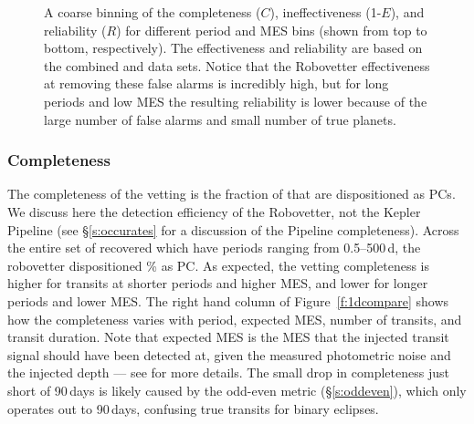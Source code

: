 \begin{figure}[hp]
\begin{center}
\begin{tabular}{c}
\end{tabular}
\caption{A coarse binning of the completeness ($C$), ineffectiveness (1-$E$), and reliability ($R$) for different period and MES bins (shown from top to bottom, respectively). The effectiveness and reliability are based on the combined \invtce{} and \scrtce{} data sets. Notice that the Robovetter effectiveness at removing these false alarms is incredibly high, but for long periods and low MES the resulting reliability is lower because of the large number of false alarms and small number of true planets.}
\label{f:scoregrid}
\end{center}
\end{figure}



\subsubsection{Completeness}
The completeness of the vetting is the fraction of  that are dispositioned as PCs. We discuss here the detection efficiency of the Robovetter, not the Kepler Pipeline (see \S\ref{s:occurates} for a discussion of the Pipeline completeness). Across the entire set of recovered  which have periods ranging from 0.5--500\,d, the robovetter dispositioned \completeness{}\% as PC. As expected, the vetting completeness is higher for transits at shorter periods and higher MES, and lower for longer periods and lower MES. The right hand column of Figure~\ref{f:1dcompare} shows how the completeness varies with period, expected MES, number of transits, and transit duration. Note that expected MES is the MES that the injected transit signal should have been detected at, given the measured photometric noise and the injected depth --- see \citealt{Christiansen2017} for more details. The small drop in completeness just short of 90\,days is likely caused by the odd-even metric (\S\ref{s:oddeven}), which only operates out to 90\,days, confusing true transits for binary eclipses.  


